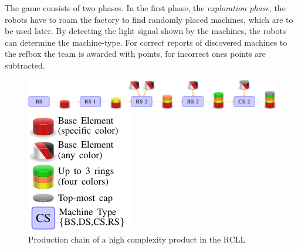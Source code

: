 The game consists of two phases. In the first phase, the
\emph{exploration phase}, the robots have to roam the factory to find
randomly placed machines, which are to be used later. By detecting the
light signal shown by the machines, the robots can determine the
machine-type. For correct reports of discovered machines to the refbox
the team is awarded with points, for incorrect ones points are subtracted.

\begin{figure}[t]
  \centering
  \begin{minipage}{.8\linewidth}
  \includegraphics[width=\linewidth]{img/chain_c3}%
  \end{minipage}
  \quad%
  \begin{minipage}{.15\linewidth}
  \includegraphics[width=\linewidth]{img/legend}%
  \end{minipage}
  \caption[Production chain of a high complexity
    product in the RCLL]{Production chain of a high complexity
    product in the RCLL~\cite{chapter-cps}}
  \vspace{-2mm}
  \label{fig:prod-chain}
\end{figure}

